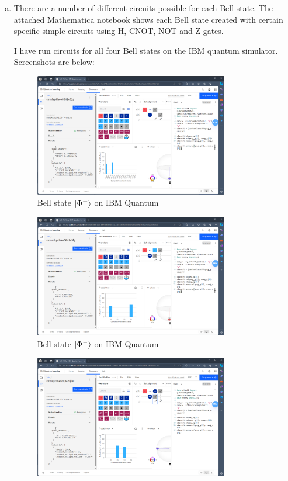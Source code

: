 \documentclass[12pt]{extarticle}
\begin{document}
\begin{enumerate}[(a)]
\item There are a number of different circuits possible for each Bell state.
The attached Mathematica notebook shows each Bell state created with
certain specific simple circuits using H, CNOT, NOT and Z gates.

I have run circuits for all four Bell states on the IBM quantum simulator.
Screenshots are below:

\begin{figure}[H]
\centering
\includegraphics[width=0.80\textwidth]{images/Bell-PhiPlus-IBM-Quantum.png}
\caption{Bell state $\ket{\Phi^{+}}$ on IBM Quantum}
\end{figure}
\begin{figure}[H]
\centering
\includegraphics[width=0.80\textwidth]{images/Bell-PhiMinus-IBM-Quantum.png}
\caption{Bell state $\ket{\Phi^{-}}$ on IBM Quantum}
\end{figure}
\begin{figure}[H]
\centering
\includegraphics[width=0.80\textwidth]{images/Bell-PsiPlus-IBM-Quantum.png}

\end{figure}
\end{enumerate}
\end{document}

